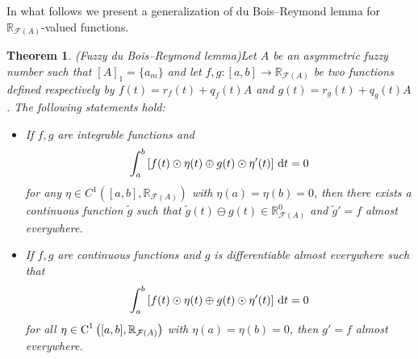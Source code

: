 \documentclass[12pt,a4paper]{article}
\newcommand{\RFA}{\mathbb{R}_{\mathcal{F}(A)}}
\newtheorem{theorem}{Theorem}
\begin{document}
In what follows we present a generalization of du Bois--Reymond lemma for $\RFA$-valued functions. 


\begin{theorem}(Fuzzy du Bois--Reymond lemma)\label{DR}
Let $A$ be an asymmetric fuzzy number such that $[A]_1 = \{a_m\}$ and let $f,g:[a,b]\longrightarrow\RFA$ be two functions defined respectively by $f(t)=r_f(t)+q_f(t)A$ and $g(t)=r_g(t)+q_g(t)A$. The following statements hold:  
\begin{itemize}
\item[(i)] If $f,g$ are integrable functions and
\begin{equation}\label{ldM}
\int_{a}^{b}\left[f(t)\odot\eta(t) \oplus g(t) \odot \eta'(t)\right]\,\textnormal{d}t=0	
\end{equation}
for any $\eta \in C^1\left([a,b],\RFA\right)$ with $\eta(a)=\eta(b)=0$, then there exists a continuous
function $\tilde{g}$ such that $\tilde{g}(t) \ominus g(t) \in \RFA^0$ and 
$\tilde{g}'=f$ almost everywhere.
	
\item[(ii)] If $f,g$ are continuous functions and $g$ is differentiable almost everywhere such that 
\begin{equation*}\label{ldM}
\int_{a}^{b}\left[f(t)\odot\eta(t) \oplus g(t) \odot \eta'(t)\right]\,\textnormal{d}t=0	
\end{equation*}
for all $\eta \in \textnormal{C}^1\left([a,b],\RFA\right)$ with $\eta(a) = \eta(b) = 0$, then 
$g' = f$ almost everywhere.

\end{itemize}
\end{theorem}
\end{document}
